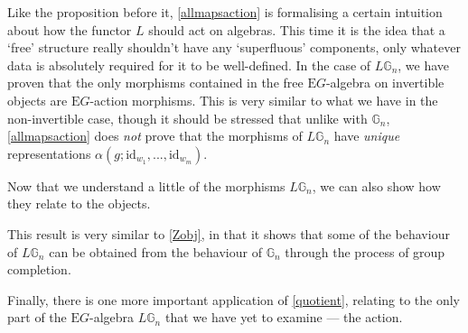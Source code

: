 Like the proposition before it, \cref{allmapsaction} is formalising a certain intuition about how the functor $L$ should act on algebras. This time it is the idea that a `free' structure really shouldn't have any `superfluous' components, only whatever data is absolutely required for it to be well-defined. In the case of $L\mathbb{G}_n$, we have proven that the only morphisms contained in the free $\mathrm{E}G$-algebra on invertible objects are $\mathrm{E}G$-action morphisms. This is very similar to what we have in the non-invertible case, though it should be stressed that unlike with $\mathbb{G}_n$, \cref{allmapsaction} does \emph{not} prove that the morphisms of $L\mathbb{G}_n$ have \emph{unique} representations $\alpha(g; \mathrm{id}_{w_1}, ..., \mathrm{id}_{w_m})$.

Now that we understand a little of the morphisms $L\mathbb{G}_n$, we can also show how they relate to the objects.

This result is very similar to \cref{Zobj}, in that it shows that some of the behaviour of $L\mathbb{G}_n$ can be obtained from the behaviour of $\mathbb{G}_n$ through the process of group completion.

Finally, there is one more important application of \cref{quotient}, relating to the only part of the $\mathrm{E}G$-algebra $L\mathbb{G}_n$ that we have yet to examine --- the action.

